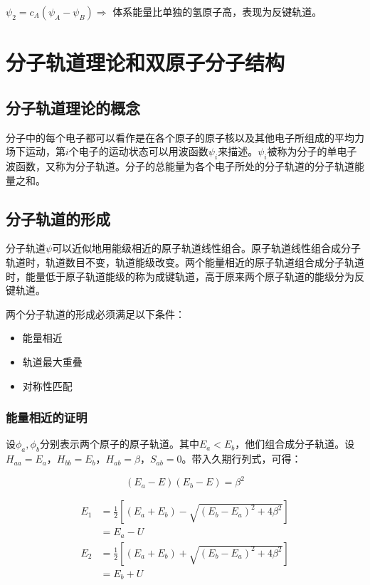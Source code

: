 $\psi_2 = c_A \left( \psi_A - \psi_B \right) \Rightarrow$ 体系能量比单独的氢原子高，表现为反键轨道。


\section{分子轨道理论和双原子分子结构}

\subsection{分子轨道理论的概念}


分子中的每个电子都可以看作是在各个原子的原子核以及其他电子所组成的平均力场下运动，第$i$个电子的运动状态可以用波函数$\psi_i$来描述。$\psi_i$被称为分子的单电子波函数，又称为分子轨道。分子的总能量为各个电子所处的分子轨道的分子轨道能量之和。


\subsection{分子轨道的形成}

分子轨道$\psi$可以近似地用能级相近的原子轨道线性组合。原子轨道线性组合成分子轨道时，轨道数目不变，轨道能级改变。两个能量相近的原子轨道组合成分子轨道时，能量低于原子轨道能级的称为成键轨道，高于原来两个原子轨道的能级分为反键轨道。

两个分子轨道的形成必须满足以下条件：

\begin{itemize}
    \item 能量相近
    \item 轨道最大重叠
    \item 对称性匹配
\end{itemize}


\subsubsection{能量相近的证明}

设$\phi_a, \phi_b$分别表示两个原子的原子轨道。其中$E_a < E_b$，他们组合成分子轨道。设$H_{aa} = E_a$，$H_{bb} = E_b$，$H_{ab} = \beta$，$S_{ab} = 0$。带入久期行列式，可得：

\begin{equation*}
    (E_a - E)(E_b - E) = \beta^2
\end{equation*}

\begin{align*}
    E_1 & = \frac{1}{2} \left[ (E_a + E_b) - \sqrt{\left(  E_b - E_a \right)^2 + 4\beta^2}  \right] \\
        & = E_a - U
\end{align*}
\begin{align*}
    E_2 & = \frac{1}{2} \left[ (E_a + E_b) + \sqrt{\left(  E_b - E_a \right)^2 + 4\beta^2}  \right] \\
        & = E_b + U
\end{align*}

